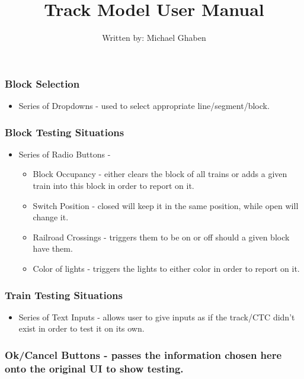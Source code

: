 \documentclass[letterpaper]{article}
\begin{document}
\subsubsection{Block Selection}
\begin{itemize}
	\item Series of Dropdowns - used to select appropriate line/segment/block.
\end{itemize}

\subsubsection{Block Testing Situations}
\begin{itemize}
	\item Series of Radio Buttons -
	\begin{itemize}
		\item Block Occupancy - either clears the block of all trains or adds a given train into this block in order to report on it.
		\item Switch Position - closed will keep it in the same position, while open will change it.
		\item Railroad Crossings - triggers them to be on or off should a given block have them.
		\item Color of lights - triggers the lights to either color in order to report on it.
	\end{itemize}
\end{itemize}

\subsubsection{Train Testing Situations}
\begin{itemize}
	\item Series of Text Inputs - allows user to give inputs as if the track/CTC didn't exist in order to test it on its own.
\end{itemize}
\subsubsection{Ok/Cancel Buttons - passes the information chosen here onto the original UI to show testing.}

\newpage

\begin{center}
	\Large
	\title{Track Model User Manual \\}
	\author{Written by: Michael Ghaben}
	\date{}	
\end{center}
\end{document}
